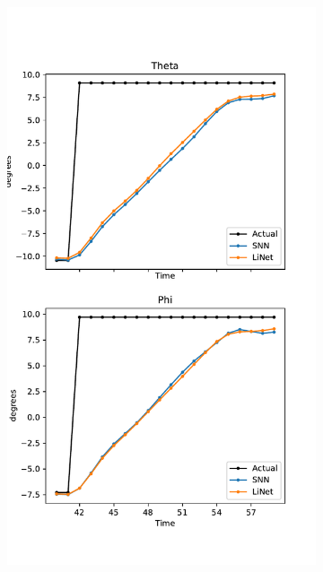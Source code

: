 \documentclass [MS] {UCLAthesis}
\begin{document}
\begin{figure}
\begin{subfigure}[b]{0.2\textwidth}
        \includegraphics[width=\textwidth]{saccade_human_ori_normal}
        \caption{}
        \label{fig:saccade_human_ori_normal}
    \end{subfigure}
    \hfill
    \begin{subfigure}[b]{0.2\textwidth}
        \centering

\end{subfigure}
\end{figure}
\end{document}
